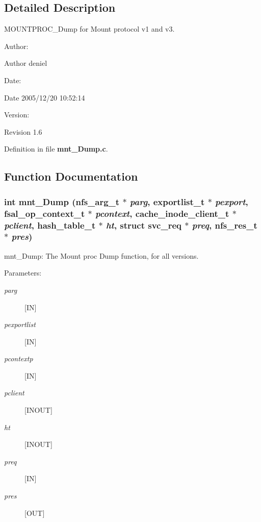 \subsection{Detailed Description}
MOUNTPROC\_\-Dump for Mount protocol v1 and v3. 

\begin{Desc}
\item[Author:]\begin{Desc}
\item[Author]deniel \end{Desc}
\end{Desc}
\begin{Desc}
\item[Date:]\begin{Desc}
\item[Date]2005/12/20 10:52:14 \end{Desc}
\end{Desc}
\begin{Desc}
\item[Version:]\begin{Desc}
\item[Revision]1.6 \end{Desc}
\end{Desc}


Definition in file {\bf mnt\_\-Dump.c}.

\subsection{Function Documentation}
\subsubsection{\setlength{\rightskip}{0pt plus 5cm}int mnt\_\-Dump (nfs\_\-arg\_\-t $\ast$ {\em parg}, exportlist\_\-t $\ast$ {\em pexport}, fsal\_\-op\_\-context\_\-t $\ast$ {\em pcontext}, cache\_\-inode\_\-client\_\-t $\ast$ {\em pclient}, hash\_\-table\_\-t $\ast$ {\em ht}, struct svc\_\-req $\ast$ {\em preq}, nfs\_\-res\_\-t $\ast$ {\em pres})}\label{mnt__Dump_8c_a0}


mnt\_\-Dump: The Mount proc Dump function, for all versions.

\begin{Desc}
\item[Parameters:]
\begin{description}
\item[{\em parg}][IN] \item[{\em pexportlist}][IN] \item[{\em pcontextp}][IN] \item[{\em pclient}][INOUT] \item[{\em ht}][INOUT] \item[{\em preq}][IN] \item[{\em pres}][OUT] \end{description}
\end{Desc}


